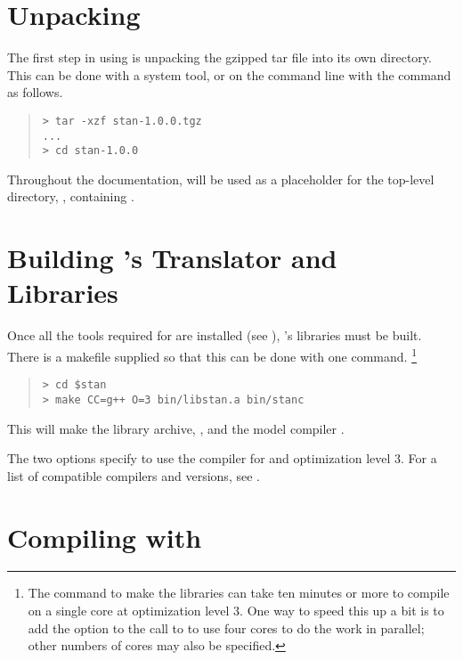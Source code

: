\section{Unpacking \Stan}

The first step in using \Stan is unpacking the gzipped tar file into
its own directory.  This can be done with a system tool, or on the
command line with the  command as follows.
%
\begin{quote}
\begin{Verbatim}[fontshape=sl]
> tar -xzf stan-1.0.0.tgz
...
> cd stan-1.0.0
\end{Verbatim}
\end{quote}
%
Throughout the documentation,  will be used as a
placeholder for the top-level directory, , containing
\Stan.


\section{Building \Stan's Translator and Libraries}\label{build-stan-libs.section}

Once all the tools required for \Stan are installed (see
), \Stan's libraries must be built.  There is a
makefile supplied so that this can be done with one command.%
%
\footnote{The command to make the \Stan libraries can take ten minutes
  or more to compile on a single core at optimization level 3.  One
  way to speed this up a bit is to add the option  to the
  call to  to use four cores to do the work in parallel;
  other numbers of cores may also be specified.}
%
\begin{quote}
\begin{Verbatim}[fontshape=sl]
> cd $stan
> make CC=g++ O=3 bin/libstan.a bin/stanc
\end{Verbatim}
\end{quote}
%
This will make the \Stan library archive, , and the
model compiler .  

The two options specify to use the
 compiler for \Cpp and optimization level 3.  For a list
of compatible compilers and versions, see .




\section{Compiling  with }


